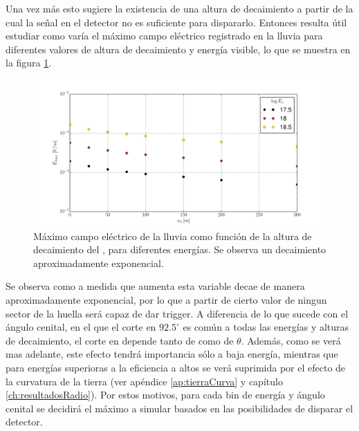 	Una vez m\'as esto sugiere la existencia de una altura de decaimiento a partir de la cual la se\~nal en el detector no es suficiente para dispararlo.
	Entonces resulta \'util estudiar como var\'ia el m\'aximo campo el\'ectrico registrado en la lluvia para diferentes valores de altura de decaimiento y energ\'ia visible, lo que se muestra en la figura \ref{fig:xd_dependence2}.
	\begin{figure}[ht!]
		\centering
		\includegraphics[width=\textwidth]{./fig/simulacionRadio/maxDep/eMaxXd}
		\caption{\label{fig:xd_dependence2}
		M\'aximo campo el\'ectrico de la lluvia como funci\'on de la altura de decaimiento del \tauon{}, para diferentes energ\'ias.
		Se observa un decaimiento aproximadamente exponencial.
		}
	\end{figure}
	
	Se observa como a medida que \xd{} aumenta esta variable decae de manera aproximadamente exponencial, por lo que a partir de cierto valor de \xd{} ningun sector de la huella ser\'a capaz de dar trigger.
	A diferencia de lo que sucede con el \'angulo cenital, en el que el corte en $92.5^\circ$ es com\'un a todas las energ\'ias y alturas de decaimiento, el corte en \xd{} depende tanto de \ev{} como de $\theta$.
	Adem\'as, como se ver\'a mas adelante, este efecto tendr\'a importancia s\'olo a baja energ\'ia, mientras que para energ\'ias superioras a  la eficiencia a altos \xd{} se ver\'a suprimida por el efecto de la curvatura de la tierra (ver ap\'endice \ref{ap:tierraCurva} y cap\'itulo \ref{ch:resultadosRadio}).
	Por estos motivos, para cada bin de energ\'ia y \'angulo cenital se decidir\'a el m\'aximo \xd{} a simular basados en las posibilidades de disparar el detector.
	
